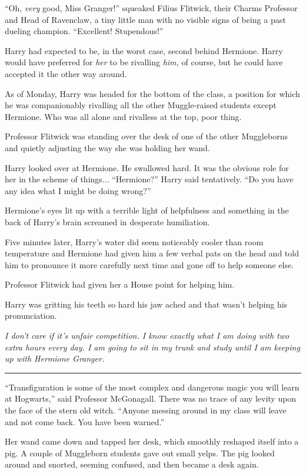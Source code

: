 ``Oh, \emph{very} good, Miss Granger!'' squeaked Filius Flitwick, their
Charms Professor and Head of Ravenclaw, a tiny little man with no
visible signs of being a past dueling champion. ``Excellent!
Stupendous!''

Harry had expected to be, in the worst case, second behind Hermione.
Harry would have preferred for \emph{her} to be rivalling \emph{him,} of
course, but he could have accepted it the other way around.

As of Monday, Harry was headed for the bottom of the class, a position
for which he was companionably rivalling all the other Muggle-raised
students except Hermione. Who was all alone and rivalless at the top,
poor thing.

Professor Flitwick was standing over the desk of one of the other
Muggleborns and quietly adjusting the way she was holding her wand.

Harry looked over at Hermione. He swallowed hard. It was the obvious
role for her in the scheme of things... ``Hermione?'' Harry said
tentatively. ``Do you have any idea what I might be doing wrong?''

Hermione's eyes lit up with a terrible light of helpfulness and
something in the back of Harry's brain screamed in desperate
humiliation.

Five minutes later, Harry's water did seem noticeably cooler than room
temperature and Hermione had given him a few verbal pats on the head and
told him to pronounce it more carefully next time and gone off to help
someone else.

Professor Flitwick had given her a House point for helping him.

Harry was gritting his teeth so hard his jaw ached and that wasn't
helping his pronunciation.

\emph{I don't care if it's unfair competition. I know exactly what I am
doing with two extra hours every day. I am going to sit in my trunk and
study until I am keeping up with Hermione Granger.}

\begin{center}\rule{3in}{0.4pt}\end{center}

``Transfiguration is some of the most complex and dangerous magic you
will learn at Hogwarts,'' said Professor McGonagall. There was no trace
of any levity upon the face of the stern old witch. ``Anyone messing
around in my class will leave and not come back. You have been warned.''

Her wand came down and tapped her desk, which smoothly reshaped itself
into a pig. A couple of Muggleborn students gave out small yelps. The
pig looked around and snorted, seeming confused, and then became a desk
again.

